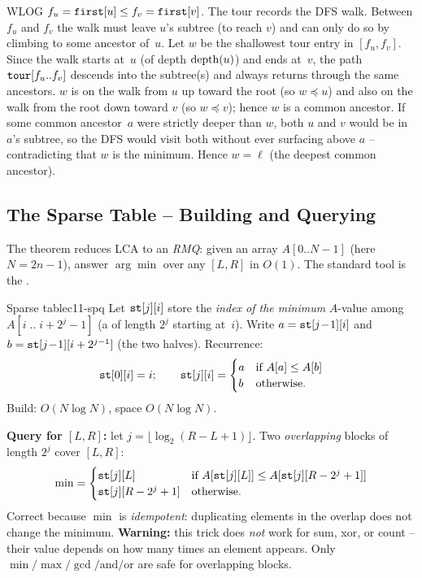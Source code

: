 \begin{proofbox}
WLOG \(f_u = \texttt{first}[u] \le f_v = \texttt{first}[v]\).  The tour
records the DFS walk.  Between \(f_u\) and \(f_v\) the walk must leave
\(u\)'s subtree (to reach \(v\)) and can only do so by climbing to some
ancestor of~\(u\).  Let \(w\) be the shallowest tour entry in
\([f_u, f_v]\).  Since the walk starts at~\(u\) (of depth \(\operatorname{depth}(u)\)) and
ends at~\(v\), the path \(\texttt{tour}[f_u..f_v]\) descends into the
subtree(s) and always returns through the same ancestors.  \(w\) is on
the walk from \(u\) up toward the root (so \(w \preceq u\)) and also on
the walk from the root down toward \(v\) (so \(w \preceq v\)); hence \(w\)
is a common ancestor.  If some common ancestor~\(a\) were strictly deeper
than \(w\), both \(u\) and \(v\) would be in \(a\)'s subtree, so the DFS
would visit both without ever surfacing above \(a\) -- contradicting that
\(w\) is the minimum.  Hence \(w = \ell\) (the deepest common ancestor).
\end{proofbox}

\subsection{The Sparse Table -- Building and Querying}

The theorem reduces LCA to an \emph{RMQ}: given an array \(A[0..N-1]\)
(here \(N = 2n-1\)), answer \(\arg\min\) over any \([L,R]\) in \(O(1)\).
The standard tool is the .

\begin{definition}{Sparse table}{c11-spq}
Let \(\texttt{st}[j][i]\) store the \emph{index of the minimum} \(A\)-value
among \(A[i \;..\; i + 2^j - 1]\) (a  of length \(2^j\)
starting at~\(i\)).  Write \(a = \texttt{st}[j\!-\!1][i]\) and
\(b = \texttt{st}[j\!-\!1][i+2^{j-1}]\) (the two halves).  Recurrence:
\[
\texttt{st}[0][i] = i; \qquad
\texttt{st}[j][i] = \begin{cases}
  a & \text{if } A[a] \le A[b]\\
  b & \text{otherwise.}
\end{cases}
\]
Build: \(O(N \log N)\), space \(O(N\log N)\).
\end{definition}

\noindent\textbf{Query for \([L,R]\):} let \(j = \lfloor\log_2(R-L+1)\rfloor\).
Two \emph{overlapping} blocks of length \(2^j\) cover \([L,R]\):
\[
  \min = \begin{cases}
    \texttt{st}[j][L] & \text{if } A[\texttt{st}[j][L]] \le A[\texttt{st}[j][R-2^j+1]]\\
    \texttt{st}[j][R-2^j+1] & \text{otherwise.}
  \end{cases}
\]
Correct because \(\min\) is \emph{idempotent}: duplicating elements in
the overlap does not change the minimum.  \textbf{Warning:} this trick
does \emph{not} work for sum, xor, or count -- their value depends on how
many times an element appears.  Only \(\min/\max/\gcd/\text{and}/\text{or}\)
are safe for overlapping blocks.

